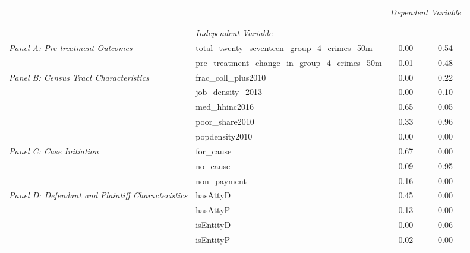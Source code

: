\begin{tabular}{llcc}
\toprule
 &  & \multicolumn{2}{c}{\textit{Dependent Variable}} \\
\cline{3-4}
\\
 &  &  &  \\
 & \emph{Independent Variable} &  &  \\
\midrule
\multirow[c]{2}{3cm}{\textit{Panel A: Pre-treatment Outcomes}} & total_twenty_seventeen_group_4_crimes_50m & 0.00 & 0.54 \\
 & pre_treatment_change_in_group_4_crimes_50m & 0.01 & 0.48 \\
\cline{1-4}
\multirow[c]{5}{3cm}{\textit{Panel B: Census Tract Characteristics}} & frac_coll_plus2010 & 0.00 & 0.22 \\
 & job_density_2013 & 0.00 & 0.10 \\
 & med_hhinc2016 & 0.65 & 0.05 \\
 & poor_share2010 & 0.33 & 0.96 \\
 & popdensity2010 & 0.00 & 0.00 \\
\cline{1-4}
\multirow[c]{3}{3cm}{\textit{Panel C: Case Initiation}} & for_cause & 0.67 & 0.00 \\
 & no_cause & 0.09 & 0.95 \\
 & non_payment & 0.16 & 0.00 \\
\cline{1-4}
\multirow[c]{4}{3cm}{\textit{Panel D: Defendant and Plaintiff Characteristics}} & hasAttyD & 0.45 & 0.00 \\
 & hasAttyP & 0.13 & 0.00 \\
 & isEntityD & 0.00 & 0.06 \\
 & isEntityP & 0.02 & 0.00 \\
\cline{1-4}
\bottomrule
\end{tabular}
